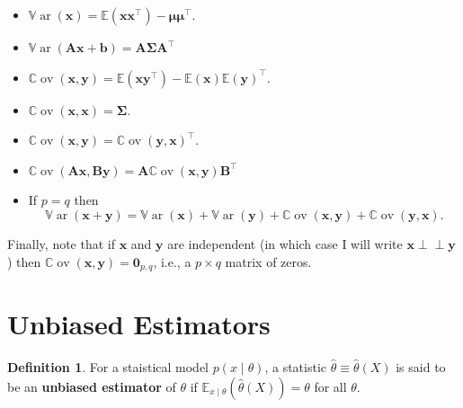 \documentclass[]{book}
\providecommand{\tightlist}{%
  \setlength{\itemsep}{0pt}\setlength{\parskip}{0pt}}
\theoremstyle{definition}
\newtheorem{definition}{Definition}[chapter]
\theoremstyle{definition}
\theoremstyle{definition}
\theoremstyle{remark}
\begin{document}
\begin{itemize}
\tightlist
\item
  \({\mathbb{V}\operatorname{ar}}(\boldsymbol x) = {\mathbb{E}}(\boldsymbol x\boldsymbol x^\top) - \boldsymbol \mu\boldsymbol \mu^\top\).
\item
  \({\mathbb{V}\operatorname{ar}}(\boldsymbol A\boldsymbol x+ \boldsymbol b) = \boldsymbol A\boldsymbol \Sigma\boldsymbol A^\top\)
\item
  \({\mathbb{C}\operatorname{ov}}(\boldsymbol x,\boldsymbol y) = {\mathbb{E}}(\boldsymbol x\boldsymbol y^\top) - {\mathbb{E}}(\boldsymbol x) {\mathbb{E}}(\boldsymbol y)^\top\).
\item
  \({\mathbb{C}\operatorname{ov}}(\boldsymbol x,\boldsymbol x) = \boldsymbol \Sigma\).
\item
  \({\mathbb{C}\operatorname{ov}}(\boldsymbol x,\boldsymbol y) = {\mathbb{C}\operatorname{ov}}(\boldsymbol y,\boldsymbol x)^\top\).
\item
  \({\mathbb{C}\operatorname{ov}}(\boldsymbol A\boldsymbol x,\boldsymbol B\boldsymbol y) = \boldsymbol A{\mathbb{C}\operatorname{ov}}(\boldsymbol x,\boldsymbol y)\boldsymbol B^\top\)
\item
  If \(p=q\) then
  \[
  {\mathbb{V}\operatorname{ar}}(\boldsymbol x+ \boldsymbol y) = {\mathbb{V}\operatorname{ar}}(\boldsymbol x) + {\mathbb{V}\operatorname{ar}}(\boldsymbol y) + {\mathbb{C}\operatorname{ov}}(\boldsymbol x,\boldsymbol y) + {\mathbb{C}\operatorname{ov}}(\boldsymbol y,\boldsymbol x).
  \]
\end{itemize}

Finally, note that if \(\boldsymbol x\) and \(\boldsymbol y\) are independent (in which case I will write \(\boldsymbol x\perp \!\!\! \perp\boldsymbol y\)) then \({\mathbb{C}\operatorname{ov}}(\boldsymbol x,\boldsymbol y) = {\mathbf 0}_{p,q}\), i.e., a \(p\times q\) matrix of zeros.

\hypertarget{unbiased-estimators}{%
\section{Unbiased Estimators}\label{unbiased-estimators}}

\begin{definition}
\protect\hypertarget{def:unnamed-chunk-11}{}{\label{def:unnamed-chunk-11} }For a staistical model \(p(x\mid \theta)\), a statistic \(\hat{\theta}\equiv\hat{\theta}(X)\) is said to be an \textbf{unbiased estimator} of \(\theta\) if \({\mathbb{E}}_{x\mid \theta}(\hat{\theta}(X)) = \theta\) for all \(\theta\).
\end{definition}
\end{document}

